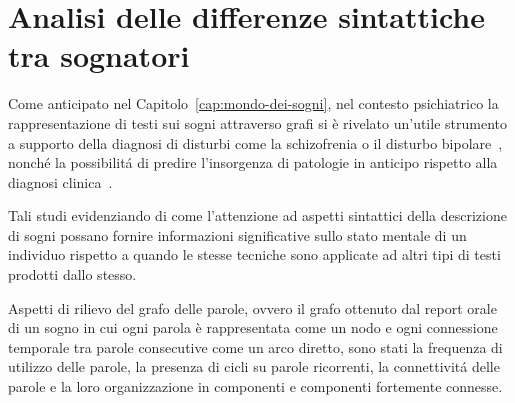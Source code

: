 \section{Analisi delle differenze sintattiche tra sognatori} \label{sec:analisi-delle-differenze-sintattiche-tra-sognatori}

Come anticipato nel Capitolo~\ref{cap:mondo-dei-sogni}, nel contesto psichiatrico la rappresentazione di testi sui
sogni attraverso grafi si \`e rivelato un'utile strumento a supporto della diagnosi di disturbi come la schizofrenia
o il disturbo bipolare~\cite{mota2014graph}, nonch\'e la possibilit\'a di predire l'insorgenza di patologie in
anticipo rispetto alla diagnosi clinica~\cite{mota2017thought}.

Tali studi evidenziando di come l'attenzione ad aspetti sintattici della descrizione di sogni possano fornire
informazioni significative sullo stato mentale di un individuo rispetto a quando le stesse tecniche sono applicate
ad altri tipi di testi prodotti dallo stesso.

Aspetti di rilievo del grafo delle parole, ovvero il grafo ottenuto dal report orale di un sogno in cui
ogni parola \`e rappresentata come un nodo e ogni connessione temporale tra parole consecutive come un arco diretto,
sono stati la frequenza di utilizzo delle parole, la presenza di cicli su parole ricorrenti, la connettivit\'a delle
parole e la loro organizzazione in componenti e componenti fortemente connesse. \newline